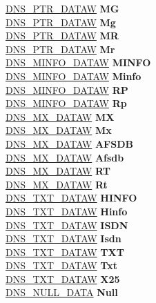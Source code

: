 \begin{DoxyCompactItemize}
\begin{tabbing}
\>\hyperlink{struct_d_n_s___p_t_r___d_a_t_a_w}{DNS\_PTR\_DATAW} {\bfseries MG}\\
\>\hyperlink{struct_d_n_s___p_t_r___d_a_t_a_w}{DNS\_PTR\_DATAW} {\bfseries Mg}\\
\>\hyperlink{struct_d_n_s___p_t_r___d_a_t_a_w}{DNS\_PTR\_DATAW} {\bfseries MR}\\
\>\hyperlink{struct_d_n_s___p_t_r___d_a_t_a_w}{DNS\_PTR\_DATAW} {\bfseries Mr}\\
\>\hyperlink{struct_d_n_s___m_i_n_f_o___d_a_t_a_w}{DNS\_MINFO\_DATAW} {\bfseries MINFO}\\
\>\hyperlink{struct_d_n_s___m_i_n_f_o___d_a_t_a_w}{DNS\_MINFO\_DATAW} {\bfseries Minfo}\\
\>\hyperlink{struct_d_n_s___m_i_n_f_o___d_a_t_a_w}{DNS\_MINFO\_DATAW} {\bfseries RP}\\
\>\hyperlink{struct_d_n_s___m_i_n_f_o___d_a_t_a_w}{DNS\_MINFO\_DATAW} {\bfseries Rp}\\
\>\hyperlink{struct_d_n_s___m_x___d_a_t_a_w}{DNS\_MX\_DATAW} {\bfseries MX}\\
\>\hyperlink{struct_d_n_s___m_x___d_a_t_a_w}{DNS\_MX\_DATAW} {\bfseries Mx}\\
\>\hyperlink{struct_d_n_s___m_x___d_a_t_a_w}{DNS\_MX\_DATAW} {\bfseries AFSDB}\\
\>\hyperlink{struct_d_n_s___m_x___d_a_t_a_w}{DNS\_MX\_DATAW} {\bfseries Afsdb}\\
\>\hyperlink{struct_d_n_s___m_x___d_a_t_a_w}{DNS\_MX\_DATAW} {\bfseries RT}\\
\>\hyperlink{struct_d_n_s___m_x___d_a_t_a_w}{DNS\_MX\_DATAW} {\bfseries Rt}\\
\>\hyperlink{struct_d_n_s___t_x_t___d_a_t_a_w}{DNS\_TXT\_DATAW} {\bfseries HINFO}\\
\>\hyperlink{struct_d_n_s___t_x_t___d_a_t_a_w}{DNS\_TXT\_DATAW} {\bfseries Hinfo}\\
\>\hyperlink{struct_d_n_s___t_x_t___d_a_t_a_w}{DNS\_TXT\_DATAW} {\bfseries ISDN}\\
\>\hyperlink{struct_d_n_s___t_x_t___d_a_t_a_w}{DNS\_TXT\_DATAW} {\bfseries Isdn}\\
\>\hyperlink{struct_d_n_s___t_x_t___d_a_t_a_w}{DNS\_TXT\_DATAW} {\bfseries TXT}\\
\>\hyperlink{struct_d_n_s___t_x_t___d_a_t_a_w}{DNS\_TXT\_DATAW} {\bfseries Txt}\\
\>\hyperlink{struct_d_n_s___t_x_t___d_a_t_a_w}{DNS\_TXT\_DATAW} {\bfseries X25}\\
\>\hyperlink{struct_d_n_s___n_u_l_l___d_a_t_a}{DNS\_NULL\_DATA} {\bfseries Null}\\

\end{tabbing}
\end{DoxyCompactItemize}
